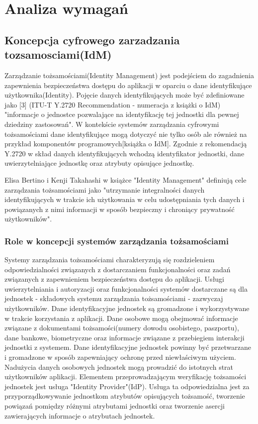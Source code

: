 \chapter{Analiza wymagań}
\label{cha:analizaWymagan}


\section{Koncepcja cyfrowego zarzadzania tozsamosciami(IdM)}
\label{sec:konceptcjaIdM}

Zarządzanie tożsamościami(Identity Management) jest podejściem do zagadnienia zapewnienia bezpieczeństwa dostępu do aplikacji w oparciu o dane identyfikujące użytkownika(Identity). Pojęcie danych identyfikujących może być zdefiniowane jako [3] (ITU-T Y.2720 Recommendation - numeracja z książki o IdM) "informacje o jednostce pozwalające na identyfikację tej jednostki dla pewnej dziedziny zastosowań". W kontekście systemów zarządzania cyfrowymi tożsamościami dane identyfikujące mogą dotyczyć nie tylko osób ale również na przykład komponentów programowych[książka o IdM]. Zgodnie z rekomendacją Y.2720 w skład danych identyfikujących wchodzą identyfikator jednostki, dane uwierzytelniające jednostkę oraz atrybuty opisujące jednostkę.

Elisa Bertino i Kenji Takahashi w książce "Identity Management" definiują cele zarządzania tożsamościami jako "utrzymanie integralności danych identyfikujących w trakcie ich użytkowania w celu udostępniania tych danych i powiązanych z nimi informacji w sposób bezpieczny i chroniący prywatność użytkowników".
 
\subsection{Role w koncepcji systemów zarządzania tożsamościami}

Systemy zarządzania tożsamościami charakteryzują się rozdzieleniem odpowiedzialności związanych z dostarczaniem funkcjonalności oraz zadań związanych z zapewnieniem bezpieczeństwa dostępu do aplikacji. Usługi uwierzytelniania i autoryzacji oraz funkcjonalności systemów dostarczane są dla jednostek - składowych systemu zarządzania tożsamościami - zazwyczaj użytkowników.
Dane identyfikacyjne jednostek są gromadzone i wykorzystywane w trakcie korzystania z aplikacji. Dane osobowe mogą obejmować informacje związane z dokumentami tożsamości(numery dowodu osobistego, paszportu), dane bankowe, biometryczne oraz informacje związane z przebiegiem interakcji jednostki z systemem. Dane identyfikacyjne jednostek powinny być przetwarzane i gromadzone w sposób zapewniający  ochronę przed niewłaściwym użyciem. Nadużycia danych osobowych jednostek mogą prowadzić do istotnych strat użytkowników aplikacji.
Elementem przeprowadzającym weryfikację tożsamości jednostek jest usługa "Identity Provider"(IdP). Usługa ta odpowiedzialna jest za przyporządkowywanie jednostkom atrybutów opisujących tożsamość, tworzenie powiązań pomiędzy różnymi atrybutami jednostki oraz tworzenie asercji zawierających informacje o atrybutach jednostek. 

